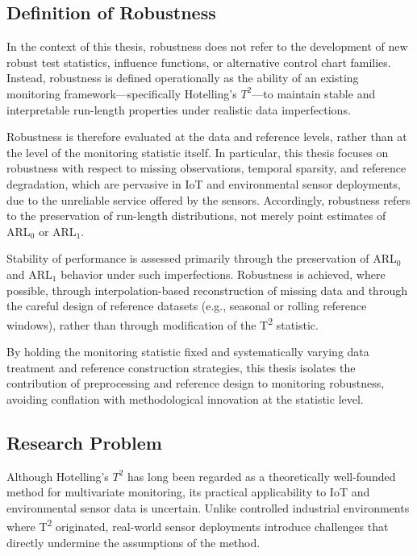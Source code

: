 \subsection{Definition of Robustness}

In the context of this thesis, robustness does not refer to the development of new robust test statistics, influence functions, or alternative control chart families. Instead, robustness is defined operationally as the ability of an existing monitoring framework—specifically Hotelling’s $T^2$—to maintain stable and interpretable run-length properties under realistic data imperfections.

Robustness is therefore evaluated at the data and reference levels, rather than at the level of the monitoring statistic itself. In particular, this thesis focuses on robustness with respect to missing observations, temporal sparsity, and reference degradation, which are pervasive in \ac{IoT} and environmental sensor deployments, due to the unreliable service offered by the sensors. Accordingly, robustness refers to the preservation of run-length distributions, not merely point estimates of \ac{ARL}$_0$ or \ac{ARL}$_1$.

Stability of performance is assessed primarily through the preservation of \ac{ARL}$_0$ and \ac{ARL}$_1$ behavior under such imperfections. Robustness is achieved, where possible, through interpolation-based reconstruction of missing data and through the careful design of reference datasets (e.g., seasonal or rolling reference windows), rather than through modification of the T\textsuperscript{2} statistic.

By holding the monitoring statistic fixed and systematically varying data treatment and reference construction strategies, this thesis isolates the contribution of preprocessing and reference design to monitoring robustness, avoiding conflation with methodological innovation at the statistic level.

\subsection{Research Problem}
Although Hotelling’s $T^2$ has long been regarded as a theoretically well-founded method for multivariate monitoring, its practical applicability to \ac{IoT} and environmental sensor data is uncertain. Unlike controlled industrial environments where T\textsuperscript{2} originated, real-world sensor deployments introduce challenges that directly undermine the assumptions of the method. 

